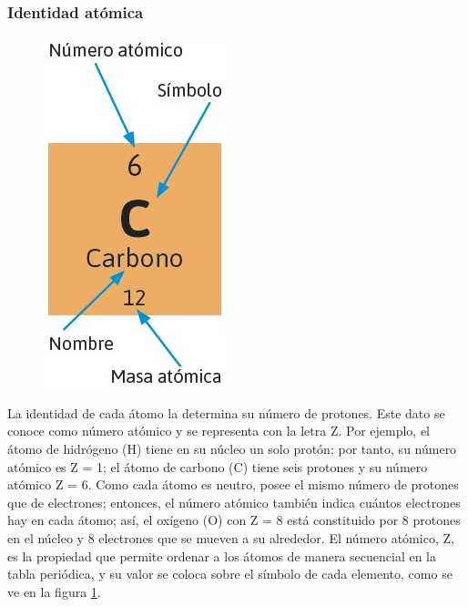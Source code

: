 \documentclass[11pt]{book}
\begin{document}
\subsubsection{Identidad atómica}

\begin{figure}
  \centering
  \includegraphics[width=0.7\linewidth]{eolementoCarbono.jpg}
  \label{fig:eolementoCarbono}
\end{figure}%

La identidad de cada átomo la determina su número de protones. Este dato se conoce como número atómico y
se representa con la letra Z. Por ejemplo, el átomo de hidrógeno (H) tiene en su núcleo un solo protón;
por tanto, su número atómico es Z = 1; el átomo de carbono (C) tiene seis protones y su número atómico
Z = 6. Como cada átomo es neutro, posee el mismo número de protones que de electrones; entonces, el número
atómico también indica cuántos electrones hay en cada átomo; así, el oxígeno (O) con Z = 8 está constituido
por 8 protones en el núcleo y 8 electrones que se mueven a su alrededor. El número atómico, Z, es la propiedad
que permite ordenar a los átomos de manera secuencial en la tabla periódica, y su valor se coloca sobre el símbolo
de cada elemento, como se ve en la figura \ref{fig:eolementoCarbono}.
\end{document}
